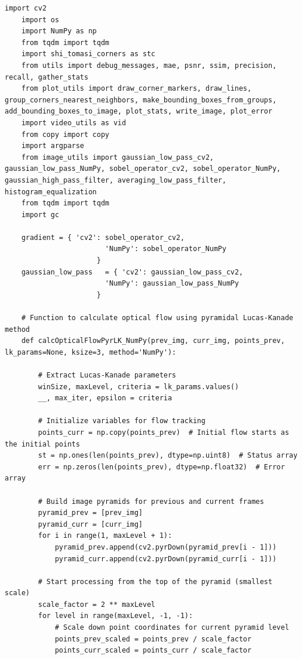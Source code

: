 \documentclass[11pt, conference, letterpaper]{IEEEtran}
\begin{document}
\begin{lstlisting}[style=python, caption={\texttt{lucas\_kanade.py}}, label={lst:lk}]
    import cv2
    import os
    import NumPy as np
    from tqdm import tqdm
    import shi_tomasi_corners as stc
    from utils import debug_messages, mae, psnr, ssim, precision, recall, gather_stats
    from plot_utils import draw_corner_markers, draw_lines, group_corners_nearest_neighbors, make_bounding_boxes_from_groups, add_bounding_boxes_to_image, plot_stats, write_image, plot_error
    import video_utils as vid
    from copy import copy
    import argparse
    from image_utils import gaussian_low_pass_cv2, gaussian_low_pass_NumPy, sobel_operator_cv2, sobel_operator_NumPy, gaussian_high_pass_filter, averaging_low_pass_filter, histogram_equalization
    from tqdm import tqdm
    import gc
    
    gradient = { 'cv2': sobel_operator_cv2,
                        'NumPy': sobel_operator_NumPy
                      }
    gaussian_low_pass   = { 'cv2': gaussian_low_pass_cv2,
                        'NumPy': gaussian_low_pass_NumPy
                      }
    
    # Function to calculate optical flow using pyramidal Lucas-Kanade method
    def calcOpticalFlowPyrLK_NumPy(prev_img, curr_img, points_prev, lk_params=None, ksize=3, method='NumPy'):
    
        # Extract Lucas-Kanade parameters
        winSize, maxLevel, criteria = lk_params.values()
        __, max_iter, epsilon = criteria
        
        # Initialize variables for flow tracking
        points_curr = np.copy(points_prev)  # Initial flow starts as the initial points
        st = np.ones(len(points_prev), dtype=np.uint8)  # Status array
        err = np.zeros(len(points_prev), dtype=np.float32)  # Error array
    
        # Build image pyramids for previous and current frames
        pyramid_prev = [prev_img]
        pyramid_curr = [curr_img]
        for i in range(1, maxLevel + 1):
            pyramid_prev.append(cv2.pyrDown(pyramid_prev[i - 1]))
            pyramid_curr.append(cv2.pyrDown(pyramid_curr[i - 1]))
    
        # Start processing from the top of the pyramid (smallest scale)
        scale_factor = 2 ** maxLevel
        for level in range(maxLevel, -1, -1):
            # Scale down point coordinates for current pyramid level
            points_prev_scaled = points_prev / scale_factor
            points_curr_scaled = points_curr / scale_factor
    

\end{lstlisting}
\end{document}
